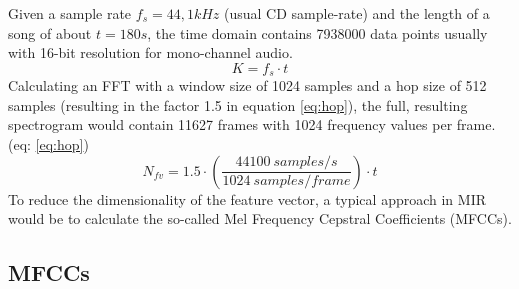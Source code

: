 Given a sample rate $f_s = 44,1kHz$ (usual CD sample-rate) and the length of a song of about $t = 180s$, the time domain contains 7938000 data points usually with 16-bit resolution for mono-channel audio. 
\begin{equation} \label{eq:points}
K = f_s \cdot t
\end{equation}
Calculating an FFT with a window size of 1024 samples and a hop size of 512 samples (resulting in the factor 1.5 in equation \ref{eq:hop})\cite[p. 41]{knees1}, the full, resulting spectrogram would contain 11627 frames with 1024 frequency values per frame. (eq: \ref{eq:hop}) 
\begin{equation} \label{eq:hop}
N_{fv} = 1.5 \cdot (\frac{44100 \ samples/s}{1024 \ samples/frame}) \cdot t
\end{equation}
To reduce the dimensionality of the feature vector, a typical approach in MIR would be to calculate the so-called Mel Frequency Cepstral Coefficients (MFCCs).

\subsection{MFCCs}\label{mfccsim}

